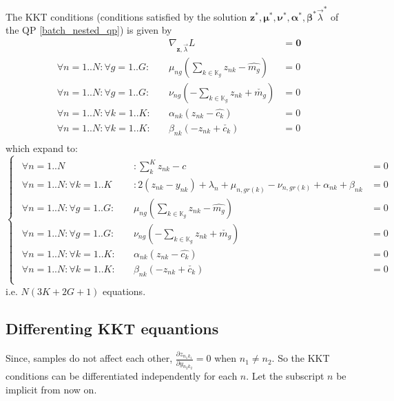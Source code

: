 \documentclass[11 pt]{article}
\begin{document}
The KKT conditions (conditions satisfied by the solution $\bm{z}^*, \bm{\mu}^*, \bm{\nu}^*, \bm{\alpha}^*, \bm{\beta}^* \vec{\lambda}^*$ of the QP \ref{batch_nested_qp}) is given by
\begin{align*}
    &\nabla_{\bm{z},\vec{\lambda}} L & = \bm{0} \\
    \forall n=1..N: \forall g=1..G: \quad &\mu_{ng}(\sum_{k \in \mathbb{K}_g} z_{nk} - \hat{m_{g}}) & = 0 \\
    \forall n=1..N: \forall g=1..G: \quad &\nu_{ng}(-\sum_{k \in \mathbb{K}_g} z_{nk} + \check{m_{g}}) & = 0 \\
    \forall n=1..N: \forall k=1..K: \quad &\alpha_{nk}(z_{nk} - \hat{c_k}) & = 0 \\
    \forall n=1..N: \forall k=1..K: \quad &\beta_{nk}(-z_{nk} + \check{c_k}) & = 0 \\
\end{align*}
which expand to:
\begin{equation}\label{eqns_batch_nesteted_kkt}
    \begin{cases}
        \begin{aligned}
            \forall n=1..N &: \sum_k^K z_{nk} - c & = 0 \\
            \forall n=1..N : \forall k=1..K \quad &: 2(z_{nk}-y_{nk}) + \lambda_n + \mu_{n,gr(k)} - \nu_{n,gr(k)} + \alpha_{nk} + \beta_{nk} & = 0 \\
            \forall n=1..N: \forall g=1..G: \quad &\mu_{ng}(\sum_{k \in \mathbb{K}_g} z_{nk} - \hat{m_{g}}) & = 0 \\
            \forall n=1..N: \forall g=1..G: \quad &\nu_{ng}(-\sum_{k \in \mathbb{K}_g} z_{nk} + \check{m_{g}}) & = 0 \\
            \forall n=1..N: \forall k=1..K: \quad &\alpha_{nk}(z_{nk} - \hat{c_k}) & = 0 \\
            \forall n=1..N: \forall k=1..K: \quad &\beta_{nk}(-z_{nk} + \check{c_k}) & = 0 \\
        \end{aligned}
    \end{cases}
\end{equation}
i.e. $N(3K + 2G + 1)$ equations.


\subsection{Differenting KKT equantions}
Since, samples do not affect each other, $\frac{\partial z_{n_1 k_1}}{\partial y_{n_2 k_2}}=0$ when $n_1 \ne n_2$. So the KKT conditions can be differentiated independently for each $n$. Let the subscript $n$ be implicit from now on.
\end{document}
